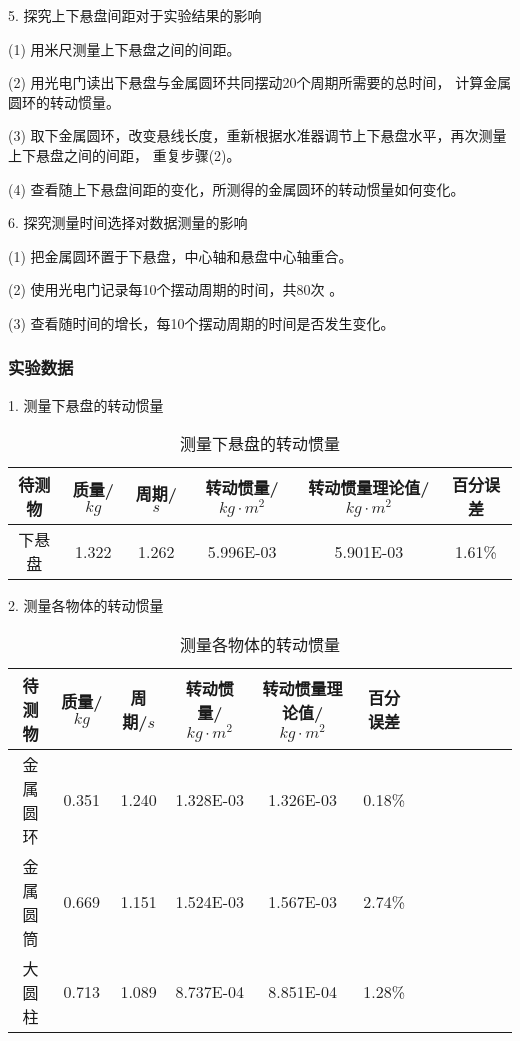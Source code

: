 \documentclass[12pt,hyperref,a4paper,UTF8]{ctexart}
\begin{document}
5. 探究上下悬盘间距对于实验结果的影响

(1) 用米尺测量上下悬盘之间的间距。

(2) 用光电门读出下悬盘与金属圆环共同摆动20个周期所需要的总时间，
计算金属圆环的转动惯量。

(3) 取下金属圆环，改变悬线长度，重新根据水准器调节上下悬盘水平，再次测量上下悬盘之间的间距，
重复步骤(2)。

(4) 查看随上下悬盘间距的变化，所测得的金属圆环的转动惯量如何变化。

6. 探究测量时间选择对数据测量的影响

(1) 把金属圆环置于下悬盘，中心轴和悬盘中心轴重合。

(2) 使用光电门记录每10个摆动周期的时间，共80次 。

(3) 查看随时间的增长，每10个摆动周期的时间是否发生变化。

\subsubsection{实验数据}

1. 测量下悬盘的转动惯量

\begin{table}[h!]
\centering
\begin{tabular}{|c|c|c|c|c|c|}
    \hline
      待测物 & 质量/$kg$ & 周期/$s$ & 转动惯量/$kg·m^2$ & 转动惯量理论值/$kg·m^2$ & 百分误差\\
    \hline
      下悬盘 & 1.322 & 1.262 & 5.996E-03 & 5.901E-03 & 1.61\% \\
    \hline
\end{tabular}
\caption{测量下悬盘的转动惯量}
\end{table}

2. 测量各物体的转动惯量

\begin{table}[h!]
\centering
\begin{tabular}{|c|c|c|c|c|c|c|c|c|c|c|c|}
    \hline
    待测物 & 质量/$kg$ & 周期/$s$ & 转动惯量/$kg·m^2$ & 转动惯量理论值/$kg·m^2$ & 百分误差 \\
    \hline
      金属圆环 & 0.351 & 1.240 &  1.328E-03 & 1.326E-03 & 0.18\% \\
    \hline
      金属圆筒 & 0.669 & 1.151 &  1.524E-03 & 1.567E-03 & 2.74\% \\
    \hline
      大圆柱 & 0.713   & 1.089 &  8.737E-04 & 8.851E-04 & 1.28\% \\
    \hline
\end{tabular}
\caption{测量各物体的转动惯量}
\end{table}
    
\end{document}
